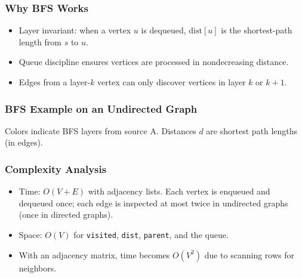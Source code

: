 \documentclass{beamer}
\begin{document}
\begin{frame}
\frametitle{Why BFS Works}
\begin{itemize}
    \item Layer invariant: when a vertex $u$ is dequeued, $\text{dist}[u]$ is the shortest-path length from $s$ to $u$.
    \item Queue discipline ensures vertices are processed in nondecreasing distance.
    \item Edges from a layer-$k$ vertex can only discover vertices in layer $k$ or $k+1$.
\end{itemize}
\end{frame}

\begin{frame}
\frametitle{BFS Example on an Undirected Graph}
\centering
{}

\small Colors indicate BFS layers from source A. Distances $d$ are shortest path lengths (in edges).
\end{frame}

\begin{frame}
\frametitle{Complexity Analysis}
\begin{itemize}
    \item Time: $O(V+E)$ with adjacency lists. Each vertex is enqueued and dequeued once; each edge is inspected at most twice in undirected graphs (once in directed graphs).
    \item Space: $O(V)$ for \texttt{visited}, \texttt{dist}, \texttt{parent}, and the queue.
    \item With an adjacency matrix, time becomes $O(V^2)$ due to scanning rows for neighbors.
\end{itemize}
\end{frame}
\end{document}

